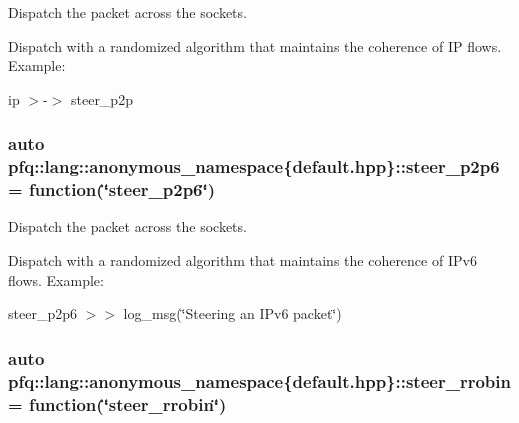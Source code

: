 Dispatch the packet across the sockets. 

Dispatch with a randomized algorithm that maintains the coherence of IP flows. Example\+:

ip $>$-\/$>$ steer\+\_\+p2p 
\subsubsection[{\texorpdfstring{steer\+\_\+p2p6}{steer_p2p6}}]{\setlength{\rightskip}{0pt plus 5cm}auto pfq\+::lang\+::anonymous\+\_\+namespace\{default.\+hpp\}\+::steer\+\_\+p2p6 = {\bf function}(\char`\"{}steer\+\_\+p2p6\char`\"{})}\hypertarget{namespacepfq_1_1lang_1_1anonymous__namespace_02default_8hpp_03_a53212b58bc49e8eab255da084295b015}{}\label{namespacepfq_1_1lang_1_1anonymous__namespace_02default_8hpp_03_a53212b58bc49e8eab255da084295b015}


Dispatch the packet across the sockets. 

Dispatch with a randomized algorithm that maintains the coherence of I\+Pv6 flows. Example\+:

steer\+\_\+p2p6 $>$$>$ log\+\_\+msg(\char`\"{}\+Steering an I\+Pv6 packet\char`\"{}) 
\subsubsection[{\texorpdfstring{steer\+\_\+rrobin}{steer_rrobin}}]{\setlength{\rightskip}{0pt plus 5cm}auto pfq\+::lang\+::anonymous\+\_\+namespace\{default.\+hpp\}\+::steer\+\_\+rrobin = {\bf function}(\char`\"{}steer\+\_\+rrobin\char`\"{})}\hypertarget{namespacepfq_1_1lang_1_1anonymous__namespace_02default_8hpp_03_a98f503710ebfe66f6866d642af30b1a8}{}\label{namespacepfq_1_1lang_1_1anonymous__namespace_02default_8hpp_03_a98f503710ebfe66f6866d642af30b1a8}


